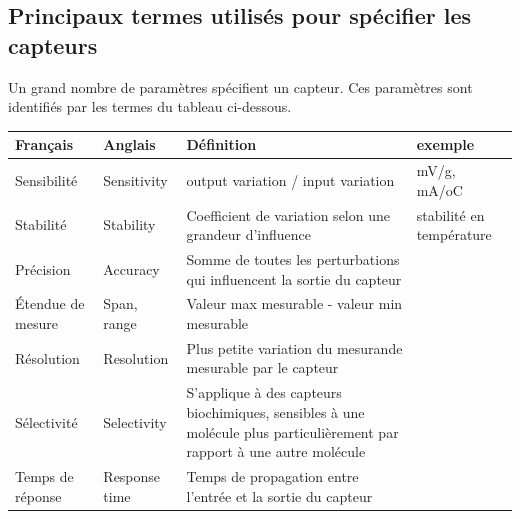 \documentclass[main.tex]{subfiles}
\begin{document}
\subsection{Principaux termes utilisés pour spécifier les capteurs}

Un grand nombre de paramètres spécifient un capteur. Ces paramètres sont identifiés par les termes du tableau ci-dessous.
\begin {center}
\begin{tabular}{|p{2.2cm}|p{2.8cm}|p{6.8cm}|p{2.4cm}|}
    \hline
    \textbf{Français}            & \textbf{Anglais}         & \textbf{Définition}                                                                                                     & \textbf{exemple}                \\
    \hline
    \hline
    Sensibilité                  & Sensitivity              & output variation / input variation                                                                                      & mV/g, mA/oC                     \\
    \hline
    Stabilité                    & Stability                & Coefficient de variation selon une grandeur d'influence                                                                 & stabilité en température        \\
    \hline
    Précision                    & Accuracy                 & Somme de toutes les perturbations qui influencent la sortie du capteur                                                  &                                 \\
    \hline
    Étendue de mesure            & Span, range              & Valeur max mesurable - valeur min mesurable                                                                             &                                 \\
    \hline
    Résolution                   & Resolution               & Plus petite variation du mesurande mesurable par le capteur                                                             &                                 \\
    \hline
    Sélectivité                  & Selectivity              & S'applique à des capteurs biochimiques, sensibles à une molécule plus particulièrement par rapport à une autre molécule &                                 \\
    \hline
    Temps de réponse             & Response time            & Temps de propagation entre l'entrée et la sortie du capteur                                                             &                                 \\

\end{tabular}
\end{center}
\end{document}
